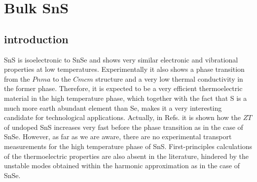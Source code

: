 
\chapter{Bulk SnS} %

\label{Chapter6} %




\section{introduction}

SnS is isoelectronic to SnSe and shows very similar electronic and vibrational properties\cite{guo2015first} at low temperatures. Experimentally it also shows a phase transition\cite{chattopadhyay1986neutron,von1981high} from 
the $Pnma$ to the $Cmcm$ structure and a very low thermal conductivity in the former\cite{he2018remarkable,tan2014thermoelectrics} phase. Therefore, it is expected to be a very efficient thermoelectric material in the high 
temperature phase, which together with the fact that S is a much more earth abundant element than Se, makes it a very interesting candidate for technological applications. Actually, in 
Refs. \cite{he2018remarkable,tan2014thermoelectrics} it is shown how the $ZT$ of undoped SnS increases very fast before the phase transition as in the case of SnSe. However, as far as we are aware, there are no experimental 
transport measurements for the high temperature phase of SnS. First-principles calculations of the thermoelectric properties are also absent in the literature, hindered by the unstable modes obtained within the harmonic 
approximation as in the case of SnSe\cite{skelton2016anharmonicity,dewandre2016two}. \\

